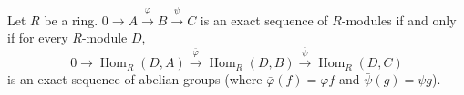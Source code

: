 Let $R$ be a ring. $0 \to A \xrightarrow{\varphi} B \xrightarrow{\psi} C$ is an exact sequence of $R$-modules if and only if for every $R$-module $D$,
\[
0 \to \operatorname{Hom}_R(D, A) \xrightarrow{\bar{\varphi}} \operatorname{Hom}_R(D, B) \xrightarrow{\bar{\psi}} \operatorname{Hom}_R(D, C)
\]
is an exact sequence of abelian groups (where $\bar{\varphi}(f) = \varphi f$ and $\bar{\psi}(g) = \psi g$).
